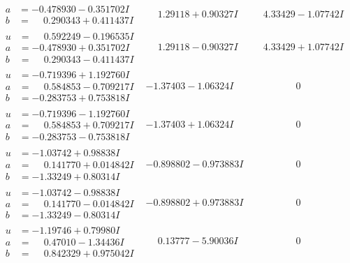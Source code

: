 \documentclass[1p]{elsarticle_modified}
\theoremstyle{definition}
\begin{document}
$$\begin{array}{c|c|c}
\begin{aligned}
a &= -0.478930 - 0.351702 I \\
b &= \phantom{-}0.290343 + 0.411437 I\end{aligned}
 & \phantom{-}1.29118 + 0.90327 I & \phantom{-}4.33429 - 1.07742 I \\ \hline\begin{aligned}
u &= \phantom{-}0.592249 - 0.196535 I \\
a &= -0.478930 + 0.351702 I \\
b &= \phantom{-}0.290343 - 0.411437 I\end{aligned}
 & \phantom{-}1.29118 - 0.90327 I & \phantom{-}4.33429 + 1.07742 I \\ \hline\begin{aligned}
u &= -0.719396 + 1.192760 I \\
a &= \phantom{-}0.584853 - 0.709217 I \\
b &= -0.283753 + 0.753818 I\end{aligned}
 & -1.37403 - 1.06324 I & \phantom{-0.000000 } 0 \\ \hline\begin{aligned}
u &= -0.719396 - 1.192760 I \\
a &= \phantom{-}0.584853 + 0.709217 I \\
b &= -0.283753 - 0.753818 I\end{aligned}
 & -1.37403 + 1.06324 I & \phantom{-0.000000 } 0 \\ \hline\begin{aligned}
u &= -1.03742 + 0.98838 I \\
a &= \phantom{-}0.141770 + 0.014842 I \\
b &= -1.33249 + 0.80314 I\end{aligned}
 & -0.898802 - 0.973883 I & \phantom{-0.000000 } 0 \\ \hline\begin{aligned}
u &= -1.03742 - 0.98838 I \\
a &= \phantom{-}0.141770 - 0.014842 I \\
b &= -1.33249 - 0.80314 I\end{aligned}
 & -0.898802 + 0.973883 I & \phantom{-0.000000 } 0 \\ \hline\begin{aligned}
u &= -1.19746 + 0.79980 I \\
a &= \phantom{-}0.47010 - 1.34436 I \\
b &= \phantom{-}0.842329 + 0.975042 I\end{aligned}
 & \phantom{-}0.13777 - 5.90036 I & \phantom{-0.000000 } 0 \\ \hline\begin{aligned}

\end{aligned}
\end{array}$$
\end{document}

